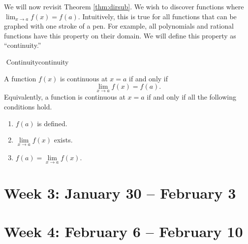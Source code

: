         We will now revisit Theorem \ref{thm:dirsub}. We wish to discover functions where \(\lim_{x\to a}f(x)=f(a)\). Intuitively, this is true for all functions that can be graphed with one stroke of a pen. For example, all polynomials and rational functions have this property on their domain. We will define this property as ``continuity.''
        \begin{definition}{\Stop\,\,Continuity}{continuity}

            A function \(f(x)\) is continuous at \(x=a\) if and only if
            \begin{equation*}
                \lim_{x\to a}f(x)=f(a).
            \end{equation*}
            Equivalently, a function is continuous at \(x=a\) if and only if all the following conditions hold.
            \begin{enumerate}
                \item \(f(a)\) is defined.
                \item \(\lim\limits_{x\to a}f(x)\) exists.
                \item \(f(a)=\lim\limits_{x\to a}f(x)\).
            \end{enumerate}
            
        \end{definition}

\pagebreak

\section{Week 3: January 30 -- February 3}

\section{Week 4: February 6 -- February 10}